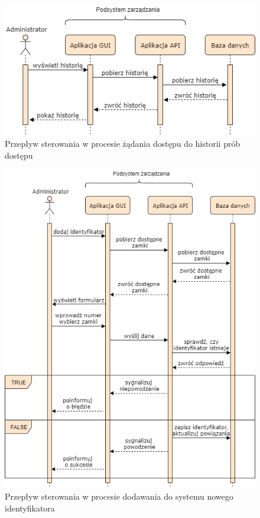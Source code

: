             \begin{figure}[]
                \centering
                \includegraphics[width=.7\linewidth]{chapters/images/sequence4.png}
                \caption{Przepływ sterowania w procesie żądania dostępu do historii prób dostępu}
                \label{fig:sequence4}
            \end{figure}

            \begin{figure}[]
                \centering
                \includegraphics[width=.7\linewidth]{chapters/images/sequence5.png}
                \caption{Przepływ sterowania w procesie dodawania do systemu nowego identyfikatora}
                \label{fig:sequence5}
            \end{figure}


                    

